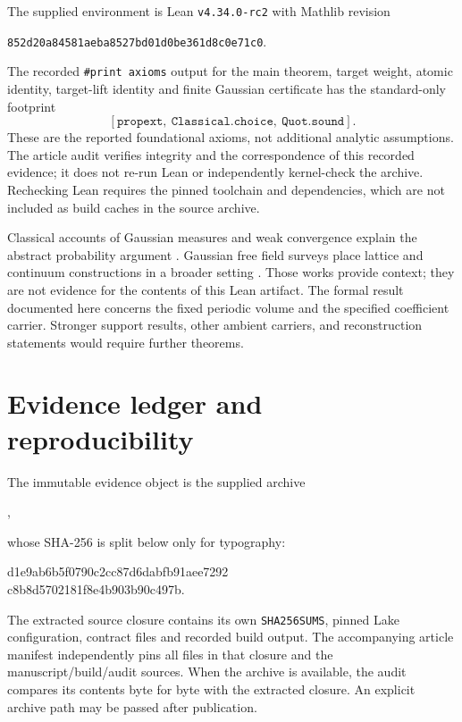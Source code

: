\documentclass[11pt]{amsart}
\theoremstyle{remark}\newtheorem{remark}[theorem]{Remark}
\begin{document}
The supplied environment is Lean \texttt{v4.34.0-rc2} with Mathlib revision
\begin{center}\texttt{852d20a84581aeba8527bd01d0be361d8c0e71c0}.
\end{center}
The recorded \texttt{\#print axioms} output for the main theorem, target weight, atomic identity, target-lift identity and finite Gaussian certificate has the standard-only footprint
\[
 [\texttt{propext},\ \texttt{Classical.choice},\ \texttt{Quot.sound}].
\]
These are the reported foundational axioms, not additional analytic assumptions. The article audit verifies integrity and the correspondence of this recorded evidence; it does not re-run Lean or independently kernel-check the archive. Rechecking Lean requires the pinned toolchain and dependencies, which are not included as build caches in the source archive.

Classical accounts of Gaussian measures and weak convergence explain the abstract probability argument \cite{Bogachev,Billingsley}. Gaussian free field surveys place lattice and continuum constructions in a broader setting \cite{Sheffield}. Those works provide context; they are not evidence for the contents of this Lean artifact. The formal result documented here concerns the fixed periodic volume and the specified coefficient carrier. Stronger support results, other ambient carriers, and reconstruction statements would require further theorems.

\appendix
\section{Evidence ledger and reproducibility}\label{app:evidence}
The immutable evidence object is the supplied archive
\begin{center},\end{center}
whose SHA-256 is split below only for typography:
\begin{center}\ttfamily
 d1e9ab6b5f0790c2cc87d6dabfb91aee7292\\
 c8b8d5702181f8e4b903b90c497b.
\end{center}
The extracted source closure contains its own \texttt{SHA256SUMS}, pinned Lake configuration, contract files and recorded build output. The accompanying article manifest independently pins all files in that closure and the manuscript/build/audit sources. When the archive is available, the audit compares its contents byte for byte with the extracted closure. An explicit archive path may be passed after publication.
\end{document}
